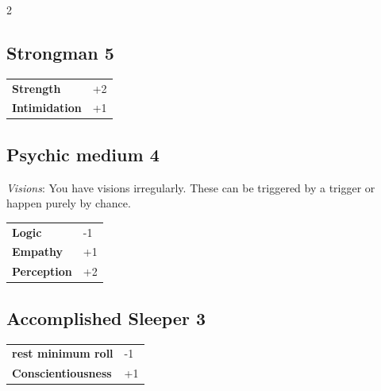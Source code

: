 \begin{multicols}{2}
\begin{tcolorbox}
    \subsection*{Strongman \hfill \small{5 }}
    \tcblower




\begin{tabular}{@{}ll@{}}
    \textbf{Strength} & +2\\
    \textbf{Intimidation} & +1\\
\end{tabular}


\end{tcolorbox}

\begin{tcolorbox}
    \subsection*{Psychic medium \hfill \small{4 }}
    \tcblower
\textit{Visions}: You have visions irregularly. These can be triggered by a trigger or happen purely by chance.


\vspace{3mm}

\begin{tabular}{@{}ll@{}}
    \textbf{Logic} & -1\\
    \textbf{Empathy} & +1\\
    \textbf{Perception} & +2\\
\end{tabular}


\end{tcolorbox}

\begin{tcolorbox}
    \subsection*{Accomplished Sleeper \hfill \small{3 }}
    \tcblower




\begin{tabular}{@{}ll@{}}
    \textbf{rest minimum roll} & -1\\
    \textbf{Conscientiousness} & +1\\
\end{tabular}


\end{tcolorbox}
\end{multicols}
